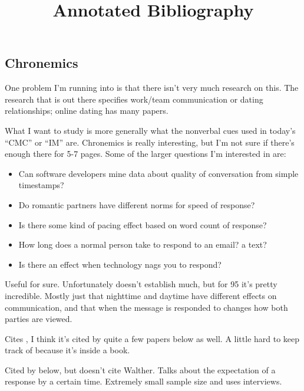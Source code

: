 \documentclass[
]{article}
\title{Annotated Bibliography}
\author{}
\date{\vspace{-2.5em}}
\providecommand{\tightlist}{%
  \setlength{\itemsep}{0pt}\setlength{\parskip}{0pt}}
\begin{document}
\maketitle

\hypertarget{chronemics}{%
\subsection{Chronemics}\label{chronemics}}

One problem I'm running into is that there isn't very much research on
this. The research that is out there specifies work/team communication
or dating relationships; online dating has many papers.

What I want to study is more generally what the nonverbal cues used in
today's ``CMC'' or ``IM'' are. Chronemics is really interesting, but I'm
not sure if there's enough there for 5-7 pages. Some of the larger
questions I'm interested in are:

\begin{itemize}
\tightlist
\item
  Can software developers mine data about quality of conversation from
  simple timestamps?
\item
  Do romantic partners have different norms for speed of response?
\item
  Is there some kind of pacing effect based on word count of response?
\item
  How long does a normal person take to respond to an email? a text?
\item
  Is there an effect when technology nags you to respond?
\end{itemize}

\textbf{}

Useful for sure. Unfortunately doesn't establish much, but for 95 it's
pretty incredible. Mostly just that nighttime and daytime have different
effects on communication, and that when the message is responded to
changes how both parties are viewed.

\textbf{}

Cites \textcite{walther95}, I think it's cited by quite a few papers
below as well. A little hard to keep track of because it's inside a
book.

\textbf{}

Cited by \textcite{kalman11} below, but doesn't cite Walther. Talks
about the expectation of a response by a certain time. Extremely small
sample size and uses interviews.
\end{document}
